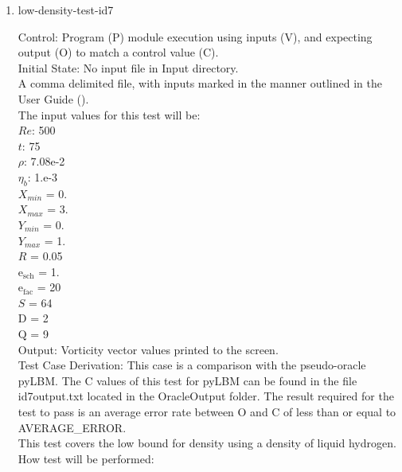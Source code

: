 \documentclass[12pt, titlepage]{article}
\begin{document}
\begin{enumerate}
\item{low-density-test-id7\\}

Control: Program (P) module execution using inputs (V), and expecting output (O) to match a control value (C).\\
					
Initial State: No input file in Input directory.\\
					
A comma delimited file, with inputs marked in the manner outlined in the User Guide (\citet{LBM_UserGuide_PM}).\\The input values for this test will be:\\
$Re$: 500\\
$t$: 75\\
$\rho$: 7.08e-2\\
$\eta_b$: 1.e-3\\
$X_{min}$ = 0.\\
$X_{max}$ = 3.\\
$Y_{min}$ = 0.\\
$Y_{max}$ = 1.\\
$R$ = 0.05\\
$\mathrm{e_{sch}}$ = 1.\\
$\mathrm{e_{fac}}$ = 20\\
$S$ = 64\\
$\mathrm{D}$ = 2\\
$\mathrm{Q}$ = 9\\

Output: Vorticity vector values printed to the screen. \\

Test Case Derivation: This case is a comparison with the pseudo-oracle pyLBM. The C values of this test for pyLBM can be found in the file id7output.txt located in the OracleOutput folder. The result required for the test to pass is an average error rate between O and C of less than or equal to AVERAGE\_ERROR.\\
This test covers the low bound for density using a density of liquid hydrogen.\\

					
How test will be performed: 


\end{enumerate}
\end{document}
